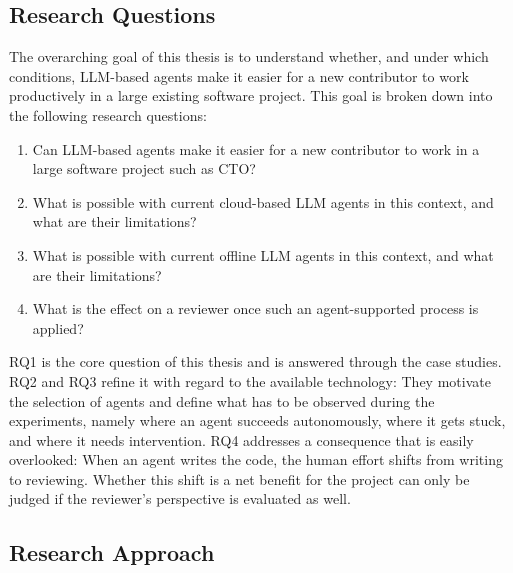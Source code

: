 \subsection{Research Questions}
\label{sec:research-questions}

The overarching goal of this thesis is to understand whether, and under which conditions, \ac{LLM}-based agents make it easier for a new contributor to work productively in a large existing software project. This goal is broken down into the following research questions:

\begin{enumerate}
	\item[\textbf{RQ1}] Can \ac{LLM}-based agents make it easier for a new contributor to work in a large software project such as \acl{CTO}?
	\item[\textbf{RQ2}] What is possible with current cloud-based \ac{LLM} agents in this context, and what are their limitations?
	\item[\textbf{RQ3}] What is possible with current offline \ac{LLM} agents in this context, and what are their limitations?
	\item[\textbf{RQ4}] What is the effect on a reviewer once such an agent-supported process is applied?
\end{enumerate}

RQ1 is the core question of this thesis and is answered through the case studies. RQ2 and RQ3 refine it with regard to the available technology: They motivate the selection of agents and define what has to be observed during the experiments, namely where an agent succeeds autonomously, where it gets stuck, and where it needs intervention. RQ4 addresses a consequence that is easily overlooked: When an agent writes the code, the human effort shifts from writing to reviewing. Whether this shift is a net benefit for the project can only be judged if the reviewer's perspective is evaluated as well.

\subsection{Research Approach} %
\label{sec:research-approach}

